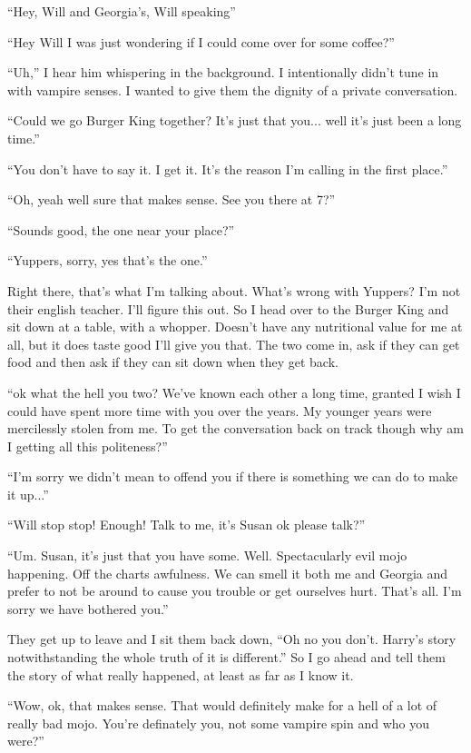 ``Hey, Will and Georgia's, Will speaking''

``Hey Will I was just wondering if I could come over for some coffee?''

``Uh,'' I hear him whispering in the background. I intentionally didn't tune in with vampire senses. I wanted to give them the dignity of a private conversation.

``Could we go Burger King together? It's just that you... well it's just been a long time.''

``You don't have to say it. I get it. It's the reason I'm calling in the first place.''

``Oh, yeah well sure that makes sense. See you there at 7?''

``Sounds good, the one near your place?''

``Yuppers, sorry, yes that's the one.''

Right there, that's what I'm talking about. What's wrong with Yuppers? I'm not their english teacher. I'll figure this out. So I head over to the Burger King and sit down at a table, with a whopper. Doesn't have any nutritional value for me at all, but it does taste good I'll give you that. The two come in, ask if they can get food and then ask if they can sit down when they get back.

``ok what the hell you two? We've known each other a long time, granted I wish I could have spent more time with you over the years. My younger years were mercilessly stolen from me. To get the conversation back on track though why am I getting all this politeness?''

``I'm sorry we didn't mean to offend you if there is something we can do to make it up...''

``Will stop stop! Enough! Talk to me, it's Susan ok please talk?''

``Um. Susan, it's just that you have some. Well. Spectacularly evil mojo happening. Off the charts awfulness. We can smell it both me and Georgia and prefer to not be around to cause you trouble or get ourselves hurt. That's all. I'm sorry we have bothered you.''

They get up to leave and I sit them back down, ``Oh no you don't. Harry's story notwithstanding the whole truth of it is different.'' So I go ahead and tell them the story of what really happened, at least as far as I know it.

``Wow, ok, that makes sense. That would definitely make for a hell of a lot of really bad mojo. You're definately you, not some vampire spin and who you were?''

